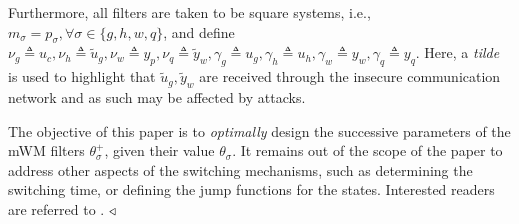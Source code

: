 Furthermore, all filters are taken to be square systems, i.e., $m_\sigma = p_\sigma, \forall \sigma \in \{g,h,w,q\}$, and define $\nu_g \triangleq u_c, \nu_h \triangleq \tilde{u}_g, \nu_w \triangleq y_p, \nu_q \triangleq \tilde{y}_w, \gamma_g \triangleq u_g, \gamma_h \triangleq u_h, \gamma_w \triangleq y_w, \gamma_q \triangleq y_q.$
    Here, a \textit{tilde} is used to highlight that $\tilde u_g, \tilde y_w$ are received through the insecure communication network and as such may be affected by attacks. 
%
%
\begin{remark}
    The objective of this paper is to \textit{optimally} design the successive parameters of the mWM filters $\theta_\sigma^+$, given their value $\theta_\sigma$. 
    It remains out of the scope of the paper to address other aspects of the switching mechanisms, such as determining the switching time, or defining the jump functions for the states. 
    Interested readers are referred to \citep{ferrari2020switching}.
    $\hfill \triangleleft$
\end{remark}

